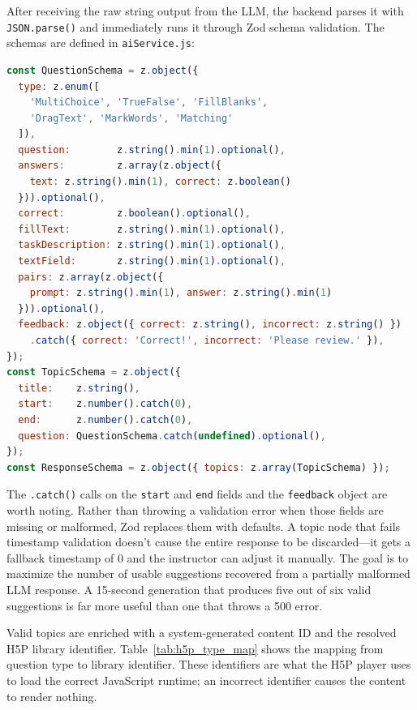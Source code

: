 After receiving the raw string output from the LLM, the backend parses it with \texttt{JSON.parse()} and immediately runs it through Zod schema validation. The schemas are defined in \texttt{aiService.js}:

\noindent\begin{minipage}{\linewidth}
\begin{lstlisting}[language=JavaScript,caption={Zod schemas for validating AI output}]
const QuestionSchema = z.object({
  type: z.enum([
    'MultiChoice', 'TrueFalse', 'FillBlanks',
    'DragText', 'MarkWords', 'Matching'
  ]),
  question:        z.string().min(1).optional(),
  answers:         z.array(z.object({
    text: z.string().min(1), correct: z.boolean()
  })).optional(),
  correct:         z.boolean().optional(),
  fillText:        z.string().min(1).optional(),
  taskDescription: z.string().min(1).optional(),
  textField:       z.string().min(1).optional(),
  pairs: z.array(z.object({
    prompt: z.string().min(1), answer: z.string().min(1)
  })).optional(),
  feedback: z.object({ correct: z.string(), incorrect: z.string() })
    .catch({ correct: 'Correct!', incorrect: 'Please review.' }),
});
const TopicSchema = z.object({
  title:    z.string(),
  start:    z.number().catch(0),
  end:      z.number().catch(0),
  question: QuestionSchema.catch(undefined).optional(),
});
const ResponseSchema = z.object({ topics: z.array(TopicSchema) });
\end{lstlisting}
\end{minipage}

The \texttt{.catch()} calls on the \texttt{start} and \texttt{end} fields and the \texttt{feedback} object are worth noting. Rather than throwing a validation error when those fields are missing or malformed, Zod replaces them with defaults. A topic node that fails timestamp validation doesn't cause the entire response to be discarded---it gets a fallback timestamp of 0 and the instructor can adjust it manually. The goal is to maximize the number of usable suggestions recovered from a partially malformed LLM response. A 15-second generation that produces five out of six valid suggestions is far more useful than one that throws a 500 error.

Valid topics are enriched with a system-generated content ID and the resolved H5P library identifier. Table~\ref{tab:h5p_type_map} shows the mapping from question type to library identifier. These identifiers are what the H5P player uses to load the correct JavaScript runtime; an incorrect identifier causes the content to render nothing.

